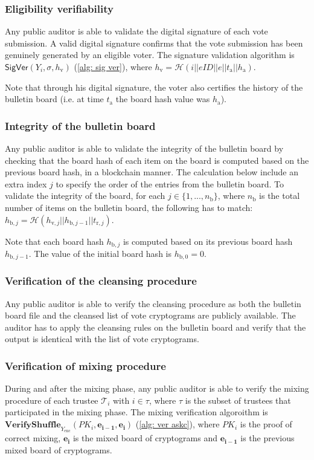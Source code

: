  
\subsubsection{Eligibility verifiability}
Any public auditor is able to validate the digital signature of each vote submission. A valid digital signature confirms that the vote submission has been genuinely generated by an eligible voter. The signature validation algorithm is \( \mathsf{SigVer} (Y_i, \sigma, h_\mathrm{v}) \) (\cref{alg: sig ver}), where \( h_\mathrm{v} = \mathcal{H}( i || eID || e || t_\mathrm{a} || h_\mathrm{a}) \).

Note that through his digital signature, the voter also certifies the history of the bulletin board (i.e. at time $t_\mathrm{a}$ the board hash value was $h_\mathrm{a}$).


\subsubsection{Integrity of the bulletin board}
Any public auditor is able to validate the integrity of the bulletin board by checking that the board hash of each item on the board is computed based on the previous board hash, in a blockchain manner. The calculation below include an extra index $j$ to specify the order of the entries from the bulletin board. To validate the integrity of the board, for each \( j \in \{ 1, ..., n_\mathrm{b} \} \), where $n_\mathrm{b}$ is the total number of items on the bulletin board, the following has to match: \( h_{\mathrm{b},j} = \mathcal{H}(h_{\mathrm{v},j} || h_{\mathrm{b},j-1} || t_{\mathrm{r},j}) \).

Note that each board hash $h_{\mathrm{b},j}$ is computed based on its previous board hash $h_{\mathrm{b},j-1}$. The value of the initial board hash is \( h_{\mathrm{b},0} = 0 \).


\subsubsection{Verification of the cleansing procedure}
Any public auditor is able to verify the cleansing procedure as both the bulletin board file and the cleansed list of vote cryptograms are publicly available. The auditor has to apply the cleansing rules on the bulletin board and verify that the output is identical with the list of vote cryptograms.


\subsubsection{Verification of mixing procedure}
During and after the mixing phase, any public auditor is able to verify the mixing procedure of each trustee $\mathcal{T}_i$ with $i \in \tau$, where $\tau$ is the subset of trustees that participated in the mixing phase. The mixing verification algoroithm is \( \mathbf{VerifyShuffle}_{Y_\mathrm{enc}} (PK_i, \boldsymbol{e_{i-1}}, \boldsymbol{e_i}) \) (\cref{alg: ver askc}), where $PK_i$ is the proof of correct mixing, $\boldsymbol{e_i}$ is the mixed board of cryptograms and $\boldsymbol{e_{i-1}}$ is the previous mixed board of cryptograms.

